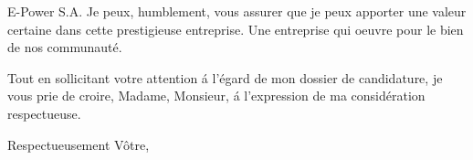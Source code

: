 \documentclass[11pt]{letter} %
\begin{document}
\begin{letter}{E-Power S.A.}
Je peux, humblement, vous assurer que je peux apporter une valeur certaine dans cette prestigieuse entreprise. Une entreprise qui oeuvre pour le bien de nos communaut\'{e}. 

Tout en sollicitant votre attention \'{a} l’\'{e}gard de mon dossier de candidature, je vous prie de croire, Madame, Monsieur, \'{a} l’expression de ma consid\'{e}ration respectueuse. 

\closing{Respectueusement V\^{o}tre,}




\end{letter}
\end{document}
